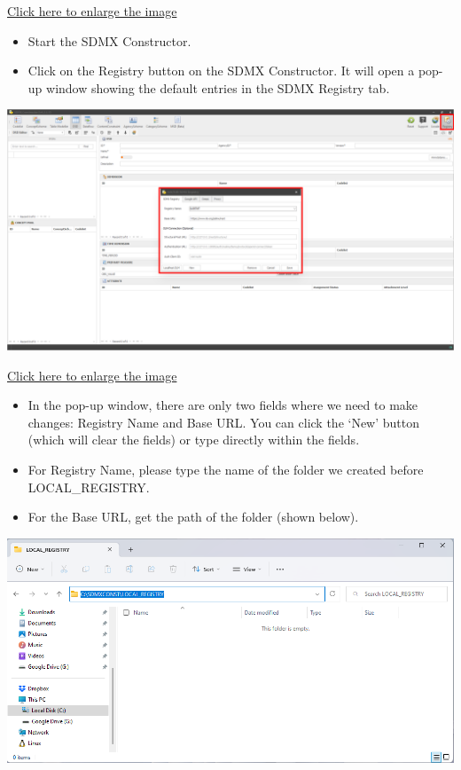 \documentclass[
]{book}
\providecommand{\tightlist}{%
  \setlength{\itemsep}{0pt}\setlength{\parskip}{0pt}}
\begin{document}
\href{images/image048.png}{Click here to enlarge the image}

\begin{itemize}
\tightlist
\item
  Start the SDMX Constructor.
\item
  Click on the Registry button on the SDMX Constructor. It will open a pop-up window showing the default entries in the SDMX Registry tab.
\end{itemize}

\begin{center}\includegraphics[width=1\linewidth]{./images/image050} \end{center}

\href{images/image050.png}{Click here to enlarge the image}

\begin{itemize}
\tightlist
\item
  In the pop-up window, there are only two fields where we need to make changes: Registry Name and Base URL. You can click the `New' button (which will clear the fields) or type directly within the fields.
\item
  For Registry Name, please type the name of the folder we created before LOCAL\_REGISTRY.
\item
  For the Base URL, get the path of the folder (shown below).
\end{itemize}

\begin{center}\includegraphics[width=1\linewidth]{./images/image052} \end{center}
\end{document}

